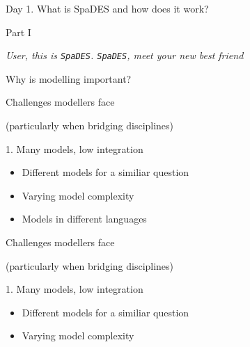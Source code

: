 \documentclass[ignorenonframetext,]{beamer}
\providecommand{\tightlist}{%
  \setlength{\itemsep}{0pt}\setlength{\parskip}{0pt}}
\begin{document}
\begin{frame}[fragile]{Day 1. What is SpaDES and how does it work?}

\begin{block}{Part I}

\end{block}

\begin{block}{\emph{User, this is \texttt{SpaDES}. \texttt{SpaDES}, meet
your new best friend}}

\end{block}

\begin{block}{Why is modelling important?}

\end{block}

\begin{block}{Challenges modellers face}

\begin{block}{(particularly when bridging disciplines)}

\begin{block}{1. Many models, low integration}

\begin{itemize}
\tightlist
\item
  Different models for a similiar question
\item
  Varying model complexity
\end{itemize}

\begin{itemize}
\tightlist
\item
  Models in different languages
\end{itemize}

\end{block}

\end{block}

\end{block}

\begin{block}{Challenges modellers face}

\begin{block}{(particularly when bridging disciplines)}

\begin{block}{1. Many models, low integration}

\begin{itemize}
\tightlist
\item
  Different models for a similiar question
\item
  Varying model complexity
\end{itemize}

\end{block}

\end{block}

\end{block}

\end{frame}
\end{document}
